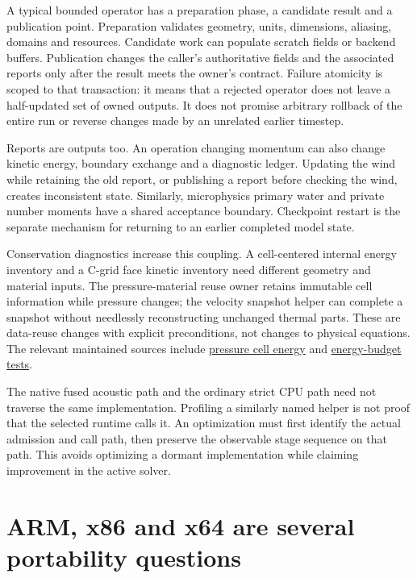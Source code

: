 A typical bounded operator has a preparation phase, a candidate result and
a publication point. Preparation validates geometry, units, dimensions,
aliasing, domains and resources. Candidate work can populate scratch fields
or backend buffers. Publication changes the caller's authoritative fields
and the associated reports only after the result meets the owner's contract.
Failure atomicity is scoped to that transaction: it means that a rejected
operator does not leave a half-updated set of owned outputs. It does not
promise arbitrary rollback of the entire run or reverse changes made by an
unrelated earlier timestep.

Reports are outputs too. An operation changing momentum can also change
kinetic energy, boundary exchange and a diagnostic ledger. Updating the wind
while retaining the old report, or publishing a report before checking the
wind, creates inconsistent state. Similarly, microphysics primary water and
private number moments have a shared acceptance boundary. Checkpoint restart
is the separate mechanism for returning to an earlier completed model state.

Conservation diagnostics increase this coupling. A cell-centered internal
energy inventory and a C-grid face kinetic inventory need different geometry
and material inputs. The pressure-material reuse owner retains immutable
cell information while pressure changes; the velocity snapshot helper can
complete a snapshot without needlessly reconstructing unchanged thermal
parts. These are data-reuse changes with explicit preconditions, not changes
to physical equations. The relevant maintained sources include
\href{../src/core/orchestration/dynamics/pressure_cell_energy.hpp}{pressure
cell energy} and
\href{../tests/diagnostics/test_energy_budget.cpp}{energy-budget tests}.

The native fused acoustic path and the ordinary strict CPU path need not
traverse the same implementation. Profiling a similarly named helper is not
proof that the selected runtime calls it. An optimization must first identify
the actual admission and call path, then preserve the observable stage
sequence on that path. This avoids optimizing a dormant implementation while
claiming improvement in the active solver.

\section{ARM, x86 and x64 are several portability questions}
\label{architecture-cpu-portability}

